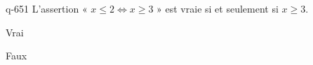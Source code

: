 \begin{truefalse}{q-651}
L'assertion « $x\leq 2 \Leftrightarrow x \geq 3$ » est vraie si et seulement si $x\geq 3$.
\item Vrai
\item* Faux
\end{truefalse}

